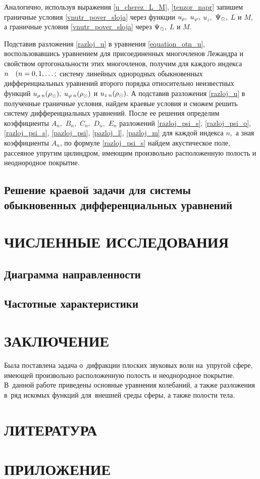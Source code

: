 Аналогично, используя выражения \eqref{u_cherez_L_M}, \eqref{tenzor_napr} запишем граничные условия \eqref{vnutr_pover_sloja} через функции $u_\rho,$ $u_\varphi,$ $u_z,$ $ \Psi_\odot,$ $L$ и $M ,$ а граничные условия \eqref{vnutr_pover_sloja} через $\Psi_\odot,$ $L$ и $M.$

Подставив разложения \eqref{razloj_u} в уравнения \eqref{equation_otn_u}, воспользовавшись уравнением для присоединенных многочленов Лежандра и свойством ортогональности этих многочленов, получим для каждого индекса $n \quad(n = 0,1,\ldots;$ систему линейных однородных обыкновенных дифференциальных уравнений второго порядка относительно неизвестных функций $u_{\rho\:n}(\rho_\odot),$ $u_{\varphi\:n}(\rho_\odot)$ и $u_{z\:n}(\rho_\odot).$ А подставив разложения \eqref{razloj_u} в полученные граничные условия, найдем краевые условия и сможем решить  систему дифференциальных уравнений. После ее решения определим коэффициенты $A_n,$ $B_n,$ $C_n,$ $D_n,$ $E_n$ разложений  \eqref{razloj_psi_s}, \eqref{razloj_psi_o}, \eqref{razloj_psi_s}, \eqref{pazloj_psi}, \eqref{pazloj_l}, \eqref{pazloj_m} для каждой индекса $n,$ а зная коэффициенты ${A}_{n}$, по формуле \eqref{razloj_psi_s} найдем акустическое поле, рассеяное упругим цилиндром, имеющим произвольно расположенную полость и неоднородное покрытие.
\newpage
\subsection{Решение краевой задачи для системы обыкновенных дифференциальных уравнений}

\newpage
\section{ЧИСЛЕННЫЕ ИССЛЕДОВАНИЯ}

\newpage
\subsection{Диаграмма направленности}

\newpage
\subsection{Частотные характеристики}


\newpage
\section*{ЗАКЛЮЧЕНИЕ}
Была поставлена задача о~дифракции плоских звуковых волн на~упругой сфере, имеющей произвольно расположенную полость и неоднородное покрытие. В~данной работе приведены основные уравнения колебаний, а также разложения в~ряд искомых функций для~внешней среды сферы, а также полости тела.

\newpage
\section*{ЛИТЕРАТУРА}

\newpage
\section*{ПРИЛОЖЕНИЕ}
